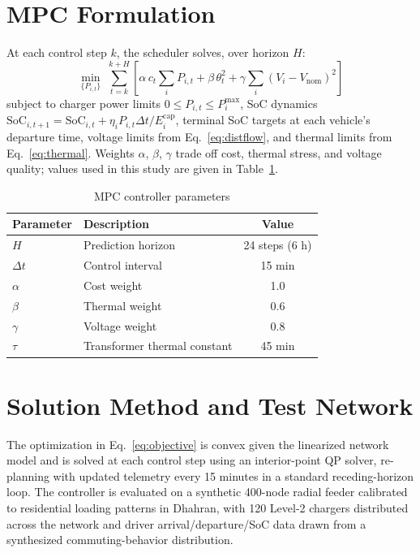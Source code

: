 \documentclass[12pt,twoside]{report}
\begin{document}
\section{MPC Formulation}
At each control step $k$, the scheduler solves, over horizon $H$:
\begin{equation}
\min_{\{P_{i,t}\}} \; \sum_{t=k}^{k+H} \left[ \alpha \, c_t \sum_i P_{i,t} + \beta \, \theta_t^2 +
\gamma \sum_i (V_i - V_{\text{nom}})^2 \right]
\label{eq:objective}
\end{equation}
subject to charger power limits $0 \le P_{i,t} \le P_i^{\max}$, SoC dynamics
$\mathrm{SoC}_{i,t+1} = \mathrm{SoC}_{i,t} + \eta_i P_{i,t} \Delta t / E_i^{\text{cap}}$, terminal
SoC targets at each vehicle's departure time, voltage limits from Eq.~\eqref{eq:distflow}, and
thermal limits from Eq.~\eqref{eq:thermal}. Weights $\alpha$, $\beta$, $\gamma$ trade off cost,
thermal stress, and voltage quality; values used in this study are given in
Table~\ref{tab:params}.

\begin{table}[htbp]
\centering
\caption{MPC controller parameters}
\label{tab:params}
\begin{tabular}{@{}llc@{}}
\toprule
\textbf{Parameter} & \textbf{Description} & \textbf{Value} \\
\midrule
$H$ & Prediction horizon & 24 steps (6 h) \\
$\Delta t$ & Control interval & 15 min \\
$\alpha$ & Cost weight & 1.0 \\
$\beta$ & Thermal weight & 0.6 \\
$\gamma$ & Voltage weight & 0.8 \\
$\tau$ & Transformer thermal constant & 45 min \\
\bottomrule
\end{tabular}
\end{table}

\section{Solution Method and Test Network}
The optimization in Eq.~\eqref{eq:objective} is convex given the linearized network model and
is solved at each control step using an interior-point QP solver, re-planning with updated
telemetry every 15 minutes in a standard receding-horizon loop. The controller is evaluated on
a synthetic 400-node radial feeder calibrated to residential loading patterns in Dhahran, with
120 Level-2 chargers distributed across the network and driver arrival/departure/SoC data drawn
from a synthesized commuting-behavior distribution.
\end{document}
